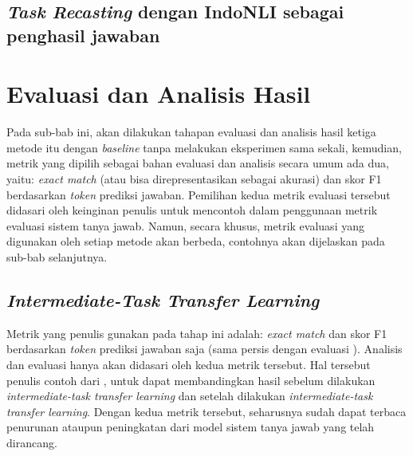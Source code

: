 \subsection{\emph{Task Recasting} dengan IndoNLI sebagai penghasil jawaban}
\todo

\section{Evaluasi dan Analisis Hasil}
Pada sub-bab ini, akan dilakukan tahapan evaluasi dan analisis hasil ketiga metode itu dengan \emph{baseline} tanpa melakukan eksperimen sama sekali, kemudian, metrik yang dipilih sebagai bahan evaluasi dan analisis secara umum ada dua, yaitu: \emph{exact match} (atau bisa direpresentasikan sebagai akurasi) dan skor F1 berdasarkan \emph{token} prediksi jawaban. Pemilihan kedua metrik evaluasi tersebut didasari oleh keinginan penulis untuk mencontoh \citep{rajpurkar-etal-2016-squad} dalam penggunaan metrik evaluasi sistem tanya jawab. Namun, secara khusus, metrik evaluasi yang digunakan oleh setiap metode akan berbeda, contohnya akan dijelaskan pada sub-bab selanjutnya.

\subsection{\emph{Intermediate-Task Transfer Learning}}
Metrik yang penulis gunakan pada tahap ini adalah: \emph{exact match} dan skor F1 berdasarkan \emph{token} prediksi jawaban saja (sama persis dengan evaluasi \citep{rajpurkar-etal-2016-squad}). Analisis dan evaluasi hanya akan didasari oleh kedua metrik tersebut. Hal tersebut penulis contoh dari \citet{rajpurkar-etal-2016-squad}, untuk dapat membandingkan hasil sebelum dilakukan \emph{intermediate-task transfer learning} dan setelah dilakukan \emph{intermediate-task transfer learning}. Dengan kedua metrik tersebut, seharusnya sudah dapat terbaca penurunan ataupun peningkatan dari model sistem tanya jawab yang telah dirancang.

